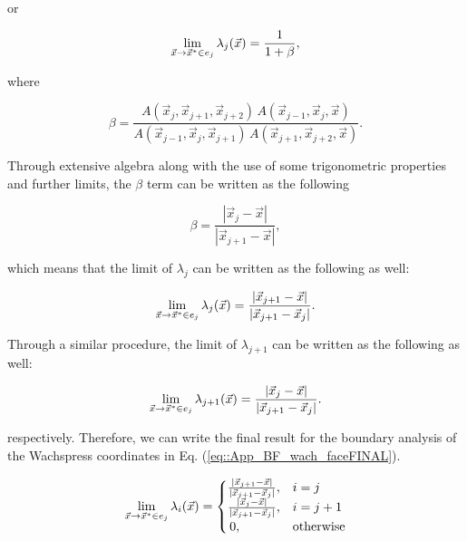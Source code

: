 \noindent or

\begin{equation}
\label{eq::App_BF_wach_edge_lim_lamj_expand2}
\lim\displaylimits_{\vec{x} \rightarrow \vec{x}^* \in e_j}  \lambda_{j} (\vec{x}) = \frac{1}{1+\beta},
\end{equation} 

\noindent where

\begin{equation}
\label{eq::App_BF_wach_beta}
\beta = \frac{A(\vec{x}_{j}, \vec{x}_{j+1}, \vec{x}_{j+2}) \, A(\vec{x}_{j-1}, \vec{x}_{j}, \vec{x})}{A(\vec{x}_{j-1}, \vec{x}_{j}, \vec{x}_{j+1}) \, A(\vec{x}_{j+1}, \vec{x}_{j+2}, \vec{x}) }. 
\end{equation} 

\noindent Through extensive algebra along with the use of some trigonometric properties and further limits, the $\beta$ term can be written as the following 

\begin{equation}
\label{eq::App_BF_wach_beta2}
\beta = \frac{|\vec{x}_{j} - \vec{x}|}{|\vec{x}_{j+1} - \vec{x}|}, 
\end{equation} 

\noindent which means that the limit of $\lambda_{j}$ can be written as the following as well:

\begin{equation}
\label{eq::App_BF_wach_edge_lim_lamj_expand3}
\lim\displaylimits_{\vec{x} \rightarrow \vec{x}^* \in e_j}  \lambda_{j} (\vec{x}) = \frac{|\vec{x}_{j+1} - \vec{x}|}{|\vec{x}_{j+1} - \vec{x}_j|} .
\end{equation} 

\noindent Through a similar procedure, the limit of $\lambda_{j+1}$ can be written as the following as well:

\begin{equation}
\label{eq::App_BF_wach_edge_lim_lamj1_expand3}
\lim\displaylimits_{\vec{x} \rightarrow \vec{x}^* \in e_j}  \lambda_{j+1} (\vec{x}) = \frac{|\vec{x}_{j} - \vec{x}|}{|\vec{x}_{j+1} - \vec{x}_j|} .
\end{equation} 

\noindent respectively. Therefore, we can write the final result for the boundary analysis of the Wachspress coordinates in Eq. (\ref{eq::App_BF_wach_faceFINAL}).

\begin{equation}
\label{eq::App_BF_wach_faceFINAL}
\lim\displaylimits_{\vec{x} \rightarrow \vec{x}^* \in e_j} \lambda_i (\vec{x}) = 
\begin{cases}
\frac{| \vec{x}_{j+1} - \vec{x} |}{| \vec{x}_{j+1} - \vec{x}_{j} |},&i=j\\
\frac{| \vec{x}_{j} - \vec{x} |}{| \vec{x}_{j+1} - \vec{x}_{j} |},&i=j+1\\
\,0,&\text{otherwise}
\end{cases}
\end{equation} 

